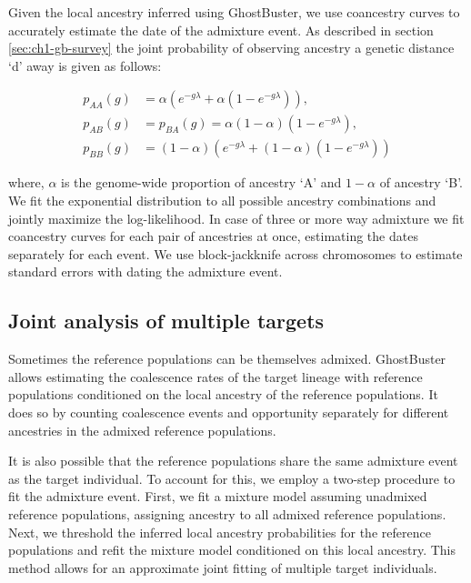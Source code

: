 Given the local ancestry inferred using GhostBuster, we use coancestry curves to accurately estimate the date of the admixture event.
%
As described in section \ref{sec:ch1-gb-survey} the joint probability of observing ancestry a genetic distance `d' away is given as follows:

\begin{equation}
\begin{aligned}
    p_{AA}(g) &= \alpha ( e^{-g\lambda} + \alpha (1-e^{-g\lambda} )), \\
    p_{AB}(g) &= p_{BA}(g) = \alpha (1 - \alpha) (1 - e^{-g\lambda}), \\
    p_{BB}(g) &= (1-\alpha) ( e^{-g\lambda} + (1-\alpha) (1-e^{-g\lambda} ))
\end{aligned}
\end{equation}

where, $\alpha$ is the genome-wide proportion of ancestry `A' and $1-\alpha$ of ancestry `B'. 
%
We fit the exponential distribution to all possible ancestry combinations and jointly maximize the log-likelihood. 
%
In case of three or more way admixture we fit coancestry curves for each pair of ancestries at once, estimating the dates separately for each event.
%
We use block-jackknife across chromosomes to estimate standard errors with dating the admixture event.
% 

\subsection{Joint analysis of multiple targets}
Sometimes the reference populations can be themselves admixed. 
%
GhostBuster allows estimating the coalescence rates of the target lineage with reference populations conditioned on the local ancestry of the reference populations. 
%
It does so by counting coalescence events and opportunity separately for different ancestries in the admixed reference populations.  

It is also possible that the reference populations share the same admixture event as the target individual. To account for this, we employ a two-step procedure to fit the admixture event. First, we fit a mixture model assuming unadmixed reference populations, assigning ancestry to all admixed reference populations. Next, we threshold the inferred local ancestry probabilities for the reference populations and refit the mixture model conditioned on this local ancestry. This method allows for an approximate joint fitting of multiple target individuals.

